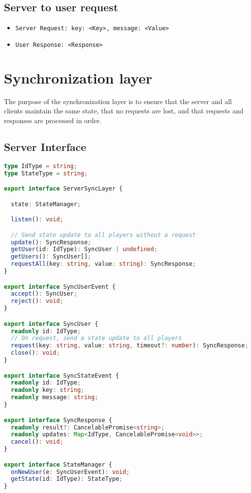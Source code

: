 \documentclass{article}
\begin{document}
\subsection*{Server to user request}
\begin{itemize}
    \item \texttt{Server Request: key: <Key>, message: <Value>}
    \item \texttt{User Response: <Response>}
\end{itemize}


\section{Synchronization layer}

The purpose of the synchronization layer is to ensure that the server and all clients maintain the same state, that no requests are lost, and that requests and responses are processed in order.

\subsection*{Server Interface}
\begin{lstlisting}[language=Typescript]
type IdType = string;
type StateType = string;

export interface ServerSyncLayer {

  state: StateManager;

  listen(): void;

  // Send state update to all players without a request
  update(): SyncResponse;
  getUser(id: IdType): SyncUser | undefined;
  getUsers(): SyncUser[];
  requestAll(key: string, value: string): SyncResponse;
}

export interface SyncUserEvent {
  accept(): SyncUser;
  reject(): void;
}

export interface SyncUser {
  readonly id: IdType;
  // On request, send a state update to all players
  request(key: string, value: string, timeout?: number): SyncResponse;
  close(): void;
}

export interface SyncStateEvent {
  readonly id: IdType;
  readonly key: string;
  readonly message: string;
}

export interface SyncResponse {
  readonly result?: CancelablePromise<string>;
  readonly updates: Map<IdType, CancelablePromise<void>>;
  cancel(): void;
}

export interface StateManager {
  onNewUser(e: SyncUserEvent): void;
  getState(id: IdType): StateType;
}
\end{lstlisting}
\end{document}
